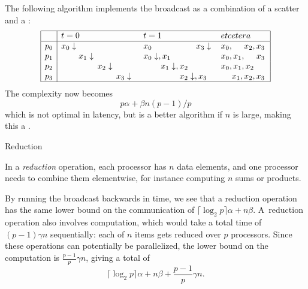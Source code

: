The following algorithm implements the broadcast as a combination of a scatter
and a :
\[
\begin{array}{|c|lll|}
\hline
  &t=0&t=1&et cetera\\ \hline
p_0&x_0\downarrow\hphantom{,x_1\downarrow,x_2\downarrow,x_3\downarrow}
   &x_0\hphantom{\downarrow,x_1\downarrow,x_2\downarrow,}x_3\downarrow
   &x_0,\hphantom{x_1,}x_2,x_3\\
p_1&\hphantom{x_0\downarrow,}x_1\downarrow\hphantom{,x_2\downarrow,x_3\downarrow}
   &x_0\downarrow,x_1\hphantom{\downarrow,x_2\downarrow,x_3\downarrow}
   &x_0,x_1,\hphantom{x_2,}x_3\\
p_2&\hphantom{x_0\downarrow,x_1\downarrow,}x_2\downarrow\hphantom{,x_3\downarrow}
   &\hphantom{x_0\downarrow,}x_1\downarrow,x_2\hphantom{\downarrow,x_3\downarrow}
   &x_0,x_1,x_2\hphantom{,x_3}\\
p_3&\hphantom{x_0\downarrow,x_1\downarrow,x_2\downarrow,}x_3\downarrow
   &\hphantom{x_0\downarrow,x_1\downarrow,}x_2\downarrow,x_3\hphantom{\downarrow}
   &\hphantom{x_0,}x_1,x_2,x_3\\
\hline
\end{array}
\]
The complexity now becomes \[ p\alpha+\beta n(p-1)/p \]
which is not optimal in latency, but is a better algorithm if $n$ is large,
making this a .


 {Reduction}
\label{sec:reduction}

In a \emph{reduction} operation, each processor has $n$ data elements, and
one processor needs to combine them elementwise, for instance
computing $n$ sums or products.

By running the broadcast backwards in time, we see that a reduction
operation has the same lower bound on the communication of
$\lceil\log_2 p\rceil \alpha+n\beta$.  A~reduction operation also
involves computation, which would take a total time of $(p-1)\gamma n$
sequentially: each of
$n$ items gets reduced over $p$ processors. Since these operations can
potentially be parallelized, the lower bound on the computation is
$\frac{p-1}p \gamma n$, giving a total of
    \[ \lceil\log_2 p\rceil \alpha+n\beta +\frac{p-1}p \gamma n. \]

